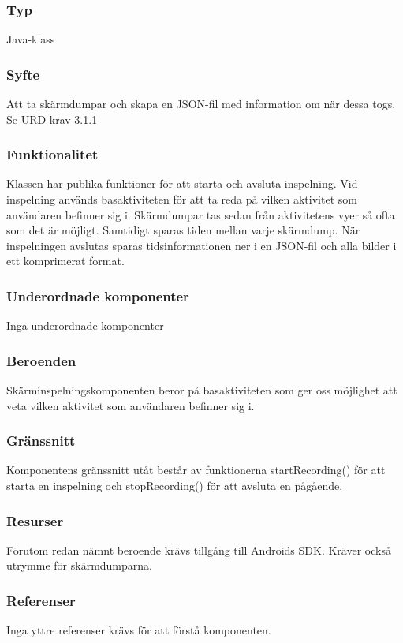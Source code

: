 \subsubsection{Typ}
Java-klass
\subsubsection{Syfte}
Att ta skärmdumpar och skapa en JSON-fil med information om när dessa togs.
Se URD-krav 3.1.1
\subsubsection{Funktionalitet}
Klassen har publika funktioner för att starta och avsluta inspelning. Vid inspelning används basaktiviteten för att ta reda på vilken aktivitet som användaren befinner sig i. Skärmdumpar tas sedan från aktivitetens vyer så ofta som det är möjligt. Samtidigt sparas tiden mellan varje skärmdump. När inspelningen avslutas sparas tidsinformationen ner i en JSON-fil och alla bilder i ett komprimerat format. 
\subsubsection{Underordnade komponenter}
Inga underordnade komponenter
\subsubsection{Beroenden}
Skärminspelningskomponenten beror på basaktiviteten som ger oss möjlighet att veta vilken aktivitet som användaren befinner sig i.
\subsubsection{Gränssnitt}
Komponentens gränssnitt utåt består av funktionerna startRecording() för att starta en inspelning och stopRecording() för att avsluta en pågående.
\subsubsection{Resurser}
Förutom redan nämnt beroende krävs tillgång till Androids SDK. Kräver också utrymme för skärmdumparna.
\subsubsection{Referenser}
Inga yttre referenser krävs för att förstå komponenten.
